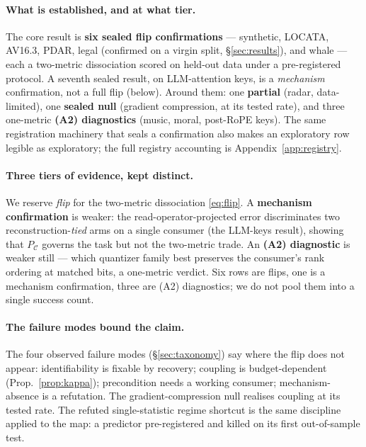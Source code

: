 \documentclass[10pt]{article} %
\theoremstyle{remark}
\newcommand{\PC}{P_{\mathcal{C}}}
\begin{document}
\paragraph{What is established, and at what tier.} The core result is \textbf{six sealed
flip confirmations} --- synthetic, LOCATA, AV16.3, PDAR, legal (confirmed on a virgin
split, \S\ref{sec:results}), and whale --- each a two-metric dissociation scored on held-out
data under a pre-registered protocol. A seventh sealed result, on LLM-attention keys, is a
\emph{mechanism} confirmation, not a full flip (below). Around them: one \textbf{partial}
(radar, data-limited), one \textbf{sealed null} (gradient compression, at its tested rate),
and three one-metric \textbf{(A2) diagnostics} (music, moral, post-RoPE keys). The same
registration machinery that seals a confirmation also makes an exploratory row legible as
exploratory; the full registry accounting is Appendix~\ref{app:registry}.

\paragraph{Three tiers of evidence, kept distinct.} We reserve \emph{flip} for the
two-metric dissociation \eqref{eq:flip}. A \textbf{mechanism confirmation} is weaker: the
read-operator-projected error discriminates two reconstruction-\emph{tied} arms on a single
consumer (the LLM-keys result), showing that $\PC$ governs the task but not the two-metric
trade. An \textbf{(A2) diagnostic} is weaker still --- which quantizer family best preserves
the consumer's rank ordering at matched bits, a one-metric verdict. Six rows are flips, one
is a mechanism confirmation, three are (A2) diagnostics; we do not pool them into a single
success count.

\paragraph{The failure modes bound the claim.} The four observed failure modes
(\S\ref{sec:taxonomy}) say where the flip does not appear: identifiability is fixable by
recovery; coupling is budget-dependent (Prop.~\ref{prop:kappa}); precondition needs a
working consumer; mechanism-absence is a refutation. The gradient-compression null realises
coupling at its tested rate. The refuted single-statistic regime shortcut is the same
discipline applied to the map: a predictor pre-registered and killed on its first
out-of-sample test.
\end{document}
